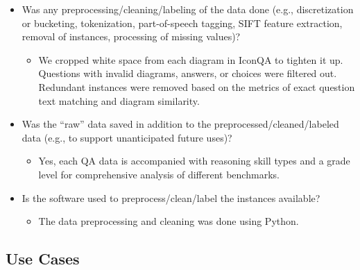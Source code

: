 \documentclass{article}
\begin{document}
\begin{itemize}
    \item Was any preprocessing/cleaning/labeling of the data done (e.g., discretization or bucketing, tokenization, part-of-speech tagging, SIFT feature extraction, removal of instances, processing of missing values)?
    \begin{itemize}
        \item We cropped white space from each diagram in IconQA to tighten it up. Questions with invalid diagrams, answers, or choices were filtered out. Redundant instances were removed based on the metrics of exact question text matching and diagram similarity.
    \end{itemize}
    \item Was the “raw” data saved in addition to the preprocessed/cleaned/labeled
data (e.g., to support unanticipated future uses)?
    \begin{itemize}
        \item Yes, each QA data is accompanied with reasoning skill types and a grade level for comprehensive analysis of different benchmarks.
    \end{itemize}
    \item Is the software used to preprocess/clean/label the instances available?
    \begin{itemize}
        \item The data preprocessing and cleaning was done using Python.
    \end{itemize}
    
\end{itemize}

\subsection{Use Cases}
\end{document}
